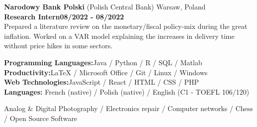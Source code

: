 \noindent\textbf{Narodowy Bank Polski} (Polish Central Bank) \hfill Warsaw, Poland\\[0.1cm]
\textbf{Research Intern}\hfill \textbf{08/2022  - 08/2022} \\
Prepared a literature review on the monetary/fiscal policy-mix during the great inflation. Worked on a VAR model explaining the increases in delivery time without price hikes in some sectors. 


	\begin{flushleft}
	\raisebox{-.6ex}{SKILLS} \hrulefill
	\end{flushleft}



  \noindent\textbf{Programming Languages:}\hfill{Java / Python / R / SQL / Matlab} \\
  \textbf{Productivity:}\hfill LaTeX / Microsoft Office / Git / Linux / Windows\\
  \textbf{Web Technologies:}\hfill JavaScript / React / HTML / CSS / PHP  \\
  \textbf{Languages:} \hfill French (native) / Polish (native) / English (C1 - TOEFL 106/120) 

	\begin{flushleft}
	\raisebox{-.6ex}{INTERESTS} \hrulefill
	\end{flushleft}

\noindent Analog \& Digital Photography / Electronics repair / Computer networks  / Chess / Open Source Software